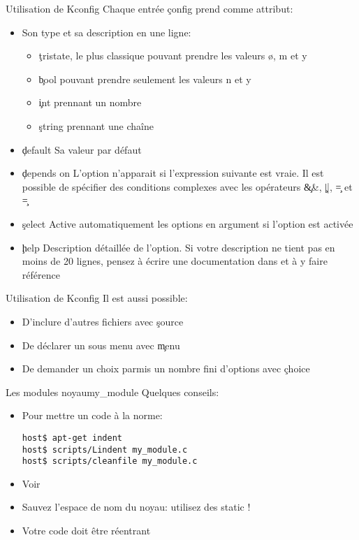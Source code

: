 \begin{frame}[fragile=singleslide]{Utilisation de Kconfig}
  Chaque entrée \c{config} prend comme attribut:
  \begin{itemize} 
  \item Son type et sa description en une ligne:
    \begin{itemize}
    \item \c{tristate}, le plus  classique pouvant prendre les valeurs
     ø, m et y
    \item \c{bool} pouvant prendre seulement les valeurs n et y
    \item \c{int} prennant un nombre
    \item \c{string} prennant une chaîne
    \end{itemize} 
  \item \c{default} Sa valeur par défaut
  \item  \c{depends on} L'option  n'apparait si  l'expression suivante
    est vraie.  Il est possible de spécifier  des conditions complexes
    avec les opérateurs \c{&&}, \c{||}, \c{=} et \c{\!=}
  \item \c{select}  Active automatiquement les options  en argument si
    l'option est activée
  \item   \c{help}  Description   détaillée  de   l'option.   Si  votre
    description ne  tient pas en moins  de 20 lignes,  pensez à écrire
    une documentation dans  et à y faire référence
  \end{itemize} 
\end{frame}

\begin{frame}[fragile=singleslide]{Utilisation de Kconfig}
  Il est aussi possible:
  \begin{itemize} 
  \item D'inclure d'autres fichiers avec \c{source}
  \item De déclarer un sous menu avec \c{menu}
  \item  De demander  un choix  parmis un  nombre fini  d'options avec
    \c{choice}
  \end{itemize} 
\end{frame}

\begin{frame}[fragile=singleslide]{Les modules noyau}{my\_module}
  Quelques conseils:
  \begin{itemize} 
  \item  Pour mettre un code à la norme:
    \begin{lstlisting}
host$ apt-get indent
host$ scripts/Lindent my_module.c
host$ scripts/cleanfile my_module.c
    \end{lstlisting} %
  \item Voir 
  \item Sauvez l'espace de nom du noyau: utilisez des static !
  \item Votre code doit être réentrant
  \end{itemize} 
\end{frame}

